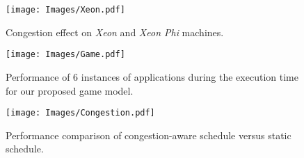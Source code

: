 \begin{figure}[!tb]
\centering
\texttt{[image: Images/Xeon.pdf]} %
\caption{Congestion effect on \textit{Xeon} and \textit{Xeon Phi} machines.}
\label{Fig:congestion}
\vspace{-1\baselineskip}
\end{figure}
\begin{figure}[!tb]
\centering
\texttt{[image: Images/Game.pdf]}%
\caption{Performance of 6 instances of applications during the execution time for our proposed game model.}\label{Fig:performance_over_time}
\end{figure}
\begin{figure}[!tb]
\centering
\texttt{[image: Images/Congestion.pdf]}  %
\caption{Performance comparison of congestion-aware schedule versus static schedule.}
\label{Fig:Perfomance_Comparison}
\vspace{-1\baselineskip}
\end{figure}
